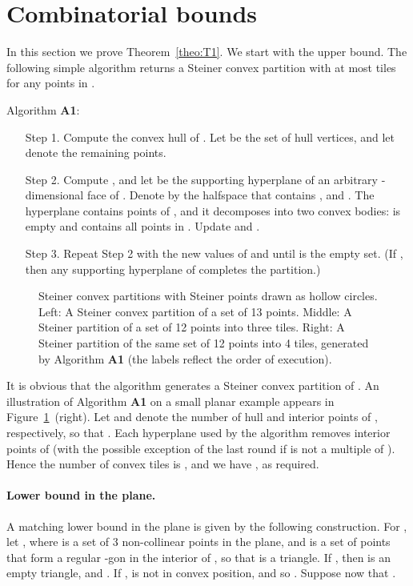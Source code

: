 \documentclass[11pt]{article}
\newcommand{\seclab}[1]{\label{sec:#1}}
\newcommand{\thmref}[1]{Theorem~\ref{theo:#1}}
\newcommand{\figlab}[1]{\label{fig:#1}}
\newcommand{\figref}[1]{Figure~\ref{fig:#1}}
\begin{document}
\section{Combinatorial bounds} \seclab{sec:bounds}

In this section we prove \thmref{T1}. We start with the upper bound.
The following simple algorithm returns a Steiner convex partition with
at most  tiles for any  points in .

\medskip
\noindent Algorithm {\bf A1}:
\begin{enumerate} \itemsep 1pt
    \item[{\sc Step 1.}] Compute the convex hull  of
    .  Let  be the set of hull vertices, and let  denote the remaining points.
    \item[{\sc Step 2.}] Compute , and let  be the
    supporting hyperplane of an arbitrary -dimensional face of
    .  Denote by  the halfspace that contains , and
    .  The hyperplane  contains  points
    of , and it decomposes  into two convex bodies: 
    is empty and  contains all points in . Update  and .
    \item[{\sc Step 3.}] Repeat {\sc Step 2} with the new values of
     and  until  is the empty set.  (If , then any
    supporting hyperplane of  completes the partition.)
\end{enumerate}

\begin{figure}[htb]
    \centerline{\epsfxsize=6.1in }
    \caption{Steiner convex partitions with Steiner points drawn as
       hollow circles. Left: A Steiner convex partition of a set of 13
       points.  Middle: A Steiner partition of a set of 12 points into
       three tiles.  Right: A Steiner partition of the same set of 12
       points into 4 tiles, generated by Algorithm {\bf A1} (the
       labels reflect the order of execution).}
    \figlab{f1}
\end{figure}

It is obvious that the algorithm generates a Steiner convex partition
of . An illustration of Algorithm {\bf A1} on a small planar
example appears in \figref{f1}~(right).  Let  and  denote the
number of hull and interior points of , respectively, so that
. Each hyperplane used by the algorithm removes  interior
points of  (with the possible exception of the last round if  is
not a multiple of ). Hence the number of convex tiles is , and we have , as required.

\paragraph{Lower bound in the plane.}  A matching lower
bound in the plane is given by the following construction.  For , let , where  is a set of 3 non-collinear points in
the plane, and  is a set of  points that form a regular
-gon in the interior of , so that 
is a triangle. If , then  is an empty triangle, and
. If ,  is not in
convex position, and so .  Suppose
now that .
\end{document}
